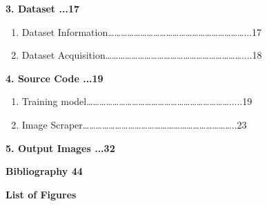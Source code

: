 \documentclass[10pt]{article} %
\begin{document}
\noindent
\textbf{3. Dataset \hspace{115mm}...17 \hspace{80mm}}

\begin{enumerate}
\item  Dataset Information{\dots}{\dots}{\dots}{\dots}{\dots}{\dots}{\dots}{\dots}{\dots}{\dots}{\dots}{\dots}{\dots}{\dots}{\dots}{\dots}{\dots}{\dots}{\dots}{\dots}{\dots}...17

\item  Dataset Acquisition{\dots}{\dots}{\dots}{\dots}{\dots}{\dots}{\dots}{\dots}{\dots}{\dots}{\dots}{\dots}{\dots}{\dots}{\dots}{\dots}{\dots}{\dots}{\dots}{\dots}{\dots}....18
\end{enumerate}
\noindent
\textbf{4. Source Code \hspace{110mm}...19}

\begin{enumerate}
\item  Training model{\dots}{\dots}{\dots}{\dots}{\dots}{\dots}{\dots}{\dots}{\dots}{\dots}{\dots}{\dots}{\dots}{\dots}{\dots}{\dots}{\dots}{\dots}{\dots}{\dots}{\dots}{\dots}.....19

\item   Image Scraper{\dots}{\dots}{\dots}{\dots}{\dots}{\dots}{\dots}{\dots}{\dots}{\dots}{\dots}{\dots}{\dots}{\dots}{\dots}{\dots}{\dots}{\dots}{\dots}{\dots}{\dots}{\dots}{\dots}..23\textbf{                                             }
\end{enumerate}
\noindent
\textbf{5. Output Images \hspace{105mm} ...32}

\vspace{10mm}
\noindent \textbf{}

\noindent \textbf{Bibliography \hspace{110mm} 44}


\newpage
\noindent \textbf{}
\begin{Center}
\textbf{\Large List of Figures}
\end{Center}
\noindent \textbf{}
\end{document}
